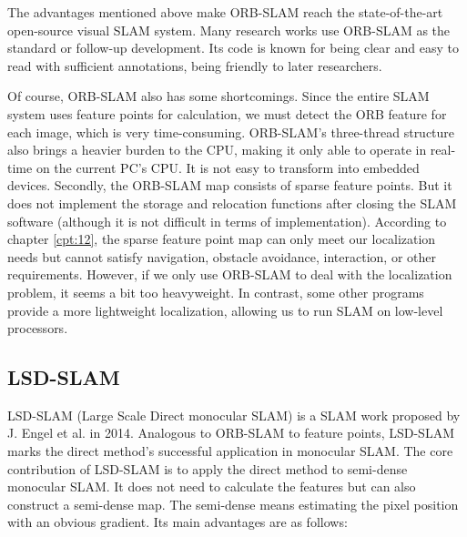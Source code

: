 The advantages mentioned above make ORB-SLAM reach the state-of-the-art open-source visual SLAM system. Many research works use ORB-SLAM as the standard or follow-up development. Its code is known for being clear and easy to read with sufficient annotations, being friendly to later researchers. 

Of course, ORB-SLAM also has some shortcomings. Since the entire SLAM system uses feature points for calculation, we must detect the ORB feature for each image, which is very time-consuming. ORB-SLAM's three-thread structure also brings a heavier burden to the CPU, making it only able to operate in real-time on the current PC's CPU. It is not easy to transform into embedded devices. Secondly, the ORB-SLAM map consists of sparse feature points. But it does not implement the storage and relocation functions after closing the SLAM software (although it is not difficult in terms of implementation). According to chapter \ref{cpt:12}, the sparse feature point map can only meet our localization needs but cannot satisfy navigation, obstacle avoidance, interaction, or other requirements. However, if we only use ORB-SLAM to deal with the localization problem, it seems a bit too heavyweight. In contrast, some other programs provide a more lightweight localization, allowing us to run SLAM on low-level processors.

\subsection{LSD-SLAM}
LSD-SLAM (Large Scale Direct monocular SLAM) is a SLAM work {\cite{Engel2013, Engel2014}} proposed by J. Engel et al. in 2014. Analogous to ORB-SLAM to feature points, LSD-SLAM marks the direct method's successful application in monocular SLAM. The core contribution of LSD-SLAM is to apply the direct method to semi-dense monocular SLAM. It does not need to calculate the features but can also construct a semi-dense map. The semi-dense means estimating the pixel position with an obvious gradient. Its main advantages are as follows:

